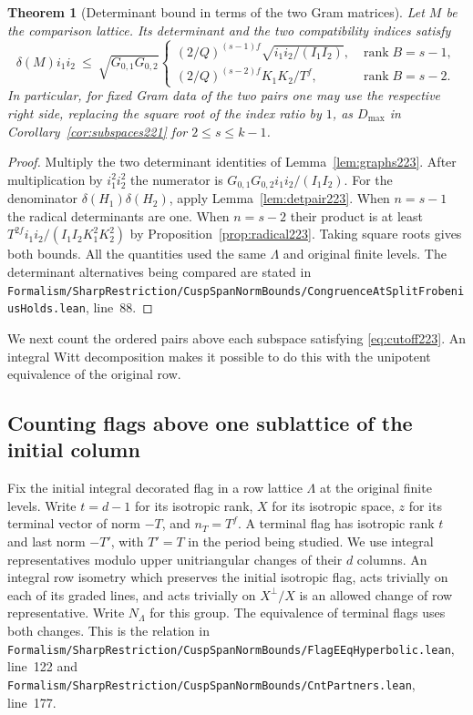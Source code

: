 \documentclass[a4paper,11pt]{article}
\newtheorem{theorem}[proposition]{Theorem}
\theoremstyle{definition}
\theoremstyle{remark}
\newcommand{\srcloc}[2]{{\small\nolinkurl{#1.lean}}, line~#2}
\numberwithin{equation}{section}
\begin{document}
\begin{theorem}[Determinant bound in terms of the two Gram matrices]
\label{thm:cutoff223}
Let \(M\) be the comparison lattice. Its determinant and the
two compatibility indices satisfy
\begin{equation}
 \delta(M)i_1i_2\ \le\ \sqrt{G_{0,1}G_{0,2}}
 \begin{cases}
  (2/Q)^{(s-1)f}\sqrt{i_1i_2/(I_1I_2)},&
                    \operatorname{rank} B=s-1,\\[2pt]
  (2/Q)^{(s-2)f}K_1K_2/T^f,&
                    \operatorname{rank} B=s-2 .
 \end{cases}
 \label{eq:cutoff223}
\end{equation}
In particular, for fixed Gram data of the two pairs one may
use the respective right side, replacing the square root of
the index ratio by \(1\), as \(D_{\max}\) in
Corollary~\ref{cor:subspaces221} for \(2\le s\le k-1\).
\end{theorem}
\begin{proof}
Multiply the two determinant identities of
Lemma~\ref{lem:graphs223}. After multiplication by
\(i_1^2i_2^2\) the numerator is
\(G_{0,1}G_{0,2} i_1i_2/(I_1I_2)\). For the denominator
\(\delta(H_1)\delta(H_2)\), apply Lemma~\ref{lem:detpair223}.
When \(n=s-1\) the radical determinants are one. When
\(n=s-2\) their product is at least
\(T^{2f}i_1i_2/(I_1I_2K_1^2K_2^2)\) by
Proposition~\ref{prop:radical223}. Taking square roots gives
both bounds. All the quantities used the same \(\Lambda\)
and original finite levels. The determinant alternatives
being compared are stated in
\srcloc{Formalism/SharpRestriction/CuspSpanNormBounds/CongruenceAtSplitFrobeniusHolds}{88}.
\end{proof}

We next count the ordered pairs above each subspace satisfying \eqref{eq:cutoff223}. An integral Witt decomposition makes it possible to do this with the unipotent equivalence of the original row.

\subsection{Counting flags above one sublattice of the initial column}\label{nav:IX-14}
\label{sec:frcount225}

Fix the initial integral decorated flag in a row lattice
\(\Lambda\) at the original finite levels. Write \(t=d-1\)
for its isotropic rank, \(X\) for its isotropic space, \(z\)
for its terminal vector of norm \(-T\), and \(n_T=T^f\).
A terminal flag has isotropic rank \(t\) and last norm
\(-T'\), with \(T'=T\) in the period being studied.
We use integral representatives modulo upper unitriangular
changes of their \(d\) columns. An integral row isometry
which preserves the initial isotropic flag, acts trivially
on each of its graded lines, and acts trivially on
\(X^\perp/X\) is an allowed change of row representative.
Write \(N_\Lambda\) for this group. The equivalence of
terminal flags uses both changes. This is the relation in
\srcloc{Formalism/SharpRestriction/CuspSpanNormBounds/FlagEEqHyperbolic}{122}
and \srcloc{Formalism/SharpRestriction/CuspSpanNormBounds/CntPartners}{177}.
\end{document}
